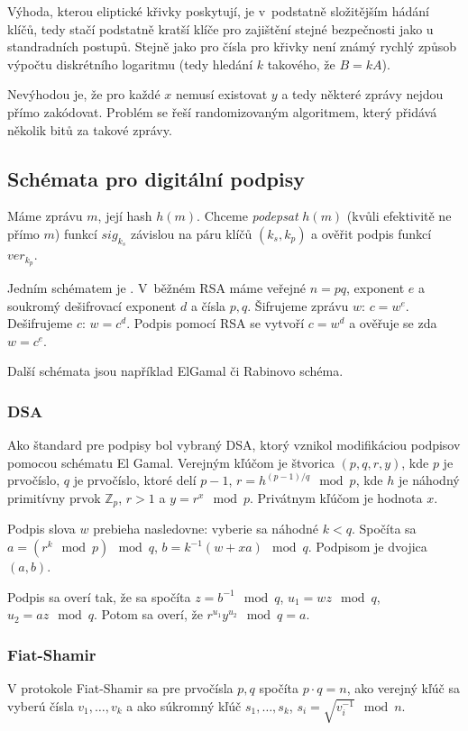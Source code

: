 Výhoda, kterou eliptické křivky poskytují, je v~podstatně složitějším
hádání klíčů, tedy stačí podstatně kratší klíče pro zajištění stejné
bezpečnosti jako u standradních postupů. Stejně jako pro čísla
pro křivky není známý rychlý
způsob výpočtu diskrétního logaritmu (tedy hledání $k$ takového, že $B =
kA$).

Nevýhodou je, že pro každé $x$ nemusí existovat $y$ a tedy některé
zprávy nejdou přímo zakódovat. Problém se řeší randomizovaným
algoritmem, který přidává několik bitů za takové zprávy.

\subsection{Schémata pro digitální podpisy}

Máme zprávu $m$, její hash $h(m)$. Chceme {\em podepsat} $h(m)$ (kvůli
efektivitě ne přímo $m$) funkcí $sig_{k_s}$ závislou na páru klíčů $(k_s,
k_p)$ a ověřit podpis funkcí $ver_{k_p}$.

Jedním schématem je . V~běžném RSA máme veřejné $n = pq$,
exponent $e$ a soukromý dešifrovací exponent $d$ a čísla $p,q$.
Šifrujeme zprávu $w$: $c = w^e$. Dešifrujeme $c$: $w = c^d$.
Podpis pomocí RSA se vytvoří $c = w^d$ a ověřuje se zda $w = c^e$.

Další schémata jsou například ElGamal či Rabinovo schéma.

\subsubsection{DSA}

Ako štandard pre podpisy bol vybraný DSA, ktorý vznikol modifikáciou
podpisov pomocou schématu El Gamal. Verejným kľúčom
je štvorica $(p,q,r,y)$, kde $p$ je prvočíslo, $q$ je prvočíslo, ktoré
delí $p-1$, $r=h^{(p-1)/q}\mod p$, kde $h$ je náhodný primitívny
prvok $\mathbb{Z}_p$, $r>1$ a $y=r^x\mod p$. Privátnym kľúčom
je hodnota $x$.

Podpis slova $w$ prebieha nasledovne: vyberie sa náhodné $k < q$.
Spočíta sa $a=(r^k\mod p) \mod q$, $b = k^{-1}(w+xa)\mod q$.
Podpisom je dvojica $(a,b)$.

Podpis sa overí tak, že sa spočíta $z=b^{-1}\mod q$, $u_1=wz\mod q$,
$u_2=az\mod q$. Potom sa overí, že $r^{u_1}y^{u_2}\mod q=a$.

\subsubsection{Fiat-Shamir}
V protokole Fiat-Shamir sa pre prvočísla $p,q$ spočíta $p \cdot q = n$,
ako verejný kľúč sa vyberú čísla $v_1, \ldots, v_k$ a ako súkromný kľúč
$s_1, \ldots, s_k$, $s_i=\sqrt{v_i^{-1}}\mod n$.

